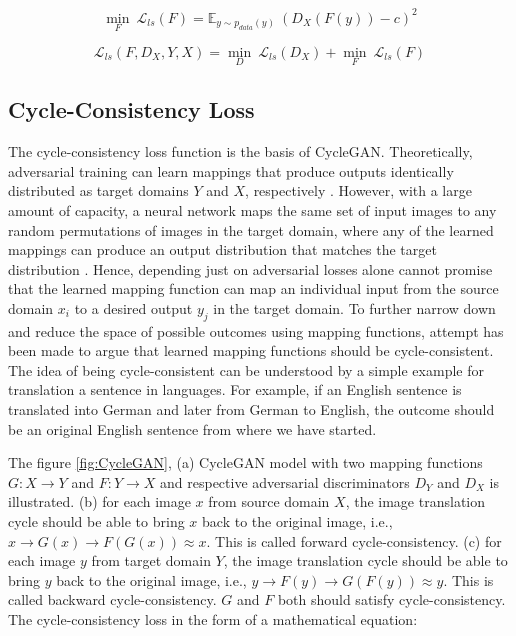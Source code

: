     \begin{equation}\label{lsgan5}        
        \underset{F}{\min}\ \mathcal{L}_{ls}(F) = \mathbb{E}_{y \sim p_{data}(y)}\ (D_X(F(y)) - c)^2
    \end{equation}
    
    
    \begin{equation}\label{lsgan6}        
        \mathcal{L}_{ls}(F, D_X, Y, X) = \underset{D}{\min}\ \mathcal{L}_{ls}(D_X) + \underset{F}{\min}\ \mathcal{L}_{ls}(F)
    \end{equation}
    

\subsection{Cycle-Consistency Loss}\label{CycleConsistencyLoss}

The cycle-consistency loss function is the basis of \ac{CycleGAN}. Theoretically, adversarial training can learn mappings that produce outputs identically distributed as target domains $Y$ and $X$, respectively \cite{goodfellow2017nips}. However, with a large amount of capacity, a neural network maps the same set of input images to any random permutations of images in the target domain,  where any of the learned mappings can produce an output distribution that matches the target distribution \cite{goodfellow2017nips}. Hence, depending just on adversarial losses alone cannot promise that the learned mapping function can map an individual input from the source domain $x_i$ to a desired output $y_j$ in the target domain. To further narrow down and reduce the space of possible outcomes using mapping functions, attempt has been made to argue that learned mapping functions should be cycle-consistent. The idea of being cycle-consistent can be understood by a simple example for translation a sentence in languages. For example, if an English sentence is translated into German and later from German to English, the outcome should be an original English sentence from where we have started. 

The figure \ref{fig:CycleGAN}, (a) \ac{CycleGAN} model with two mapping functions $G : X \rightarrow Y$ and $F : Y \rightarrow X$ and respective adversarial discriminators $D_Y$ and $D_X$ is illustrated. (b) for each image $x$ from source domain $X$, the image translation cycle should be able to bring $x$ back to the original image, i.e., $x \rightarrow G(x) \rightarrow F(G(x)) \approx x$. This is called forward cycle-consistency. (c) for each image $y$ from target domain $Y$, the image translation cycle should be able to bring $y$ back to the original image, i.e., $y \rightarrow F(y) \rightarrow G(F(y)) \approx y$. This is called backward cycle-consistency. $G$ and $F$ both should satisfy cycle-consistency. The cycle-consistency loss in the form of a mathematical equation:

